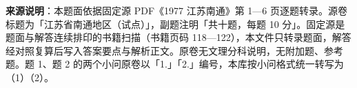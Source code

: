 


\begin{gktip}
\textbf{来源说明}：本题面依据固定源 PDF《1977 江苏南通》第 1—6 页逐题转录。源卷标题为「江苏省南通地区（试点）」，副题注明「共十题，每题 10 分」。固定源是题面与解答连续排印的书籍扫描（书籍页码 118—122），本文件只转录题面，解答经对照复算后写入答案要点与解析正文。原卷无文理分科说明，无附加题、参考题。题 1、题 2 的两个小问原卷以「1.」「2.」编号，本库按小问格式统一转写为（1）（2）。
\end{gktip}

\par\medskip

